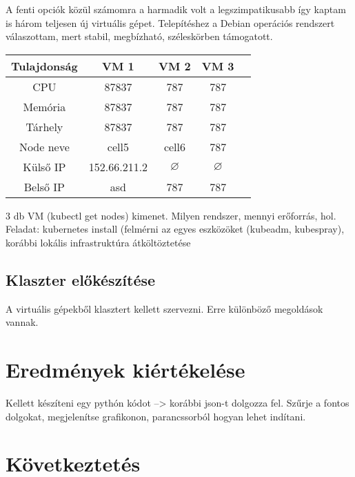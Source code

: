 A fenti opciók közül számomra a harmadik volt a legszimpatikusabb így kaptam is három teljesen új virtuális gépet. Telepítéshez a Debian operációs rendszert válaszottam, mert stabil, megbízható, széleskörben támogatott.

\begin{center}
\begin{tabular}{ c||cccc| } 
\hline 
Tulajdonság & VM 1 & VM 2 & VM 3 \\
\hline \hline
CPU & 87837 & 787 & 787 \\ 
Memória & 87837 & 787 & 787 \\
Tárhely & 87837 & 787 & 787 \\  
Node neve & cell5 & cell6 & 787 \\ 
Külső IP & 152.66.211.2 & $\varnothing$ & $\varnothing$ \\ 
Belső IP & asd & 787 & 787 \\
\hline
\end{tabular}
\end{center}

3 db VM (kubectl get nodes) kimenet. Milyen rendszer, mennyi erőforrás, hol. Feladat: kubernetes install (felmérni az egyes eszközöket (kubeadm, kubespray), korábbi lokális infrastruktúra átköltöztetése  

\subsection{Klaszter előkészítése}
A virtuális gépekből klasztert kellett szervezni. Erre különböző megoldások vannak.\citep{kubernetesInstall} 

\section{Eredmények kiértékelése}
Kellett készíteni egy pythón kódot --> korábbi json-t dolgozza fel. Szűrje a fontos dolgokat, megjelenítse grafikonon, parancssorból hogyan lehet indítani.

\section{Következtetés}
